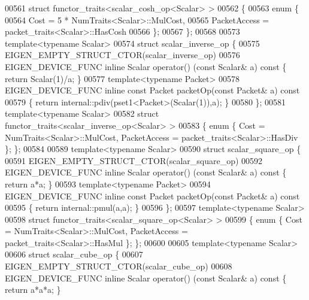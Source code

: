 \begin{DoxyCode}
00561 \textcolor{keyword}{struct }functor\_traits<scalar\_cosh\_op<Scalar> >
00562 \{
00563   \textcolor{keyword}{enum} \{
00564     Cost = 5 * NumTraits<Scalar>::MulCost,
00565     PacketAccess = packet\_traits<Scalar>::HasCosh
00566   \};
00567 \};
00568 
00573 \textcolor{keyword}{template}<\textcolor{keyword}{typename} Scalar>
00574 \textcolor{keyword}{struct }scalar\_inverse\_op \{
00575   EIGEN\_EMPTY\_STRUCT\_CTOR(scalar\_inverse\_op)
00576   EIGEN\_DEVICE\_FUNC \textcolor{keyword}{inline} Scalar operator() (\textcolor{keyword}{const} Scalar& a)\textcolor{keyword}{ const }\{ \textcolor{keywordflow}{return} Scalar(1)/a; \}
00577   \textcolor{keyword}{template}<\textcolor{keyword}{typename} Packet>
00578   EIGEN\_DEVICE\_FUNC \textcolor{keyword}{inline} \textcolor{keyword}{const} Packet packetOp(\textcolor{keyword}{const} Packet& a)\textcolor{keyword}{ const}
00579 \textcolor{keyword}{  }\{ \textcolor{keywordflow}{return} internal::pdiv(pset1<Packet>(Scalar(1)),a); \}
00580 \};
00581 \textcolor{keyword}{template}<\textcolor{keyword}{typename} Scalar>
00582 \textcolor{keyword}{struct }functor\_traits<scalar\_inverse\_op<Scalar> >
00583 \{ \textcolor{keyword}{enum} \{ Cost = NumTraits<Scalar>::MulCost, PacketAccess = packet\_traits<Scalar>::HasDiv \}; \};
00584 
00589 \textcolor{keyword}{template}<\textcolor{keyword}{typename} Scalar>
00590 \textcolor{keyword}{struct }scalar\_square\_op \{
00591   EIGEN\_EMPTY\_STRUCT\_CTOR(scalar\_square\_op)
00592   EIGEN\_DEVICE\_FUNC \textcolor{keyword}{inline} Scalar operator() (\textcolor{keyword}{const} Scalar& a)\textcolor{keyword}{ const }\{ \textcolor{keywordflow}{return} a*a; \}
00593   \textcolor{keyword}{template}<\textcolor{keyword}{typename} Packet>
00594   EIGEN\_DEVICE\_FUNC \textcolor{keyword}{inline} \textcolor{keyword}{const} Packet packetOp(\textcolor{keyword}{const} Packet& a)\textcolor{keyword}{ const}
00595 \textcolor{keyword}{  }\{ \textcolor{keywordflow}{return} internal::pmul(a,a); \}
00596 \};
00597 \textcolor{keyword}{template}<\textcolor{keyword}{typename} Scalar>
00598 \textcolor{keyword}{struct }functor\_traits<scalar\_square\_op<Scalar> >
00599 \{ \textcolor{keyword}{enum} \{ Cost = NumTraits<Scalar>::MulCost, PacketAccess = packet\_traits<Scalar>::HasMul \}; \};
00600 
00605 \textcolor{keyword}{template}<\textcolor{keyword}{typename} Scalar>
00606 \textcolor{keyword}{struct }scalar\_cube\_op \{
00607   EIGEN\_EMPTY\_STRUCT\_CTOR(scalar\_cube\_op)
00608   EIGEN\_DEVICE\_FUNC \textcolor{keyword}{inline} Scalar operator() (\textcolor{keyword}{const} Scalar& a)\textcolor{keyword}{ const }\{ \textcolor{keywordflow}{return} a*a*a; \}

\end{DoxyCode}
